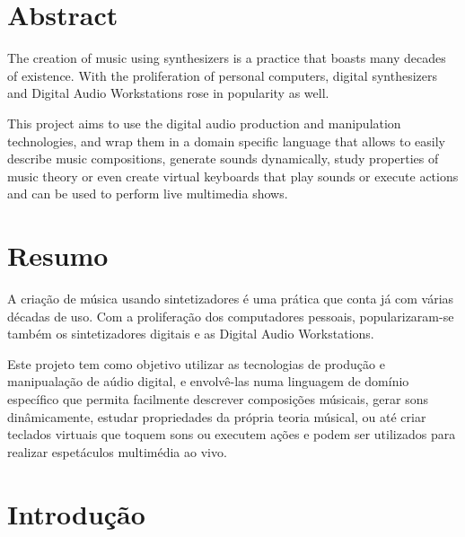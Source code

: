 \documentclass[
  oneside,
  11pt, a4paper,
  footinclude=true,
  headinclude=true,
  cleardoublepage=empty
]{scrbook}
\author{Pedro M. Silva}
\date{\myear} %
\begin{document}
	\umfrontcover	
	\umtitlepage
	


	\chapter*{Abstract}
	The creation of music using synthesizers is a practice that boasts many decades of existence. With the proliferation of personal computers, digital synthesizers and Digital Audio Workstations rose in popularity as well.
	
	This project aims to use the digital audio production and manipulation technologies, and wrap them in a domain specific language that allows to easily describe music compositions, generate sounds dynamically, study properties of music theory or even create virtual keyboards that play sounds or execute actions and can be used to perform live multimedia shows.
	
	\cleardoublepage
	\chapter*{Resumo}
	A criação de música usando sintetizadores é uma prática que conta já com várias décadas de uso. Com a proliferação dos computadores pessoais, popularizaram-se também os sintetizadores digitais e as Digital Audio Workstations.
	
	Este projeto tem como objetivo utilizar as tecnologias de produção e manipualação de aúdio digital, e envolvê-las numa linguagem de domínio específico que permita facilmente descrever composições músicais, gerar sons dinâmicamente, estudar propriedades da própria teoria músical, ou até criar teclados virtuais que toquem sons ou executem ações e podem ser utilizados para realizar espetáculos multimédia ao vivo.
	

	\tableofcontents
	\listoffigures
	\listoftables
	
	
	
	\chapter{Introdução}
	
\end{document}
